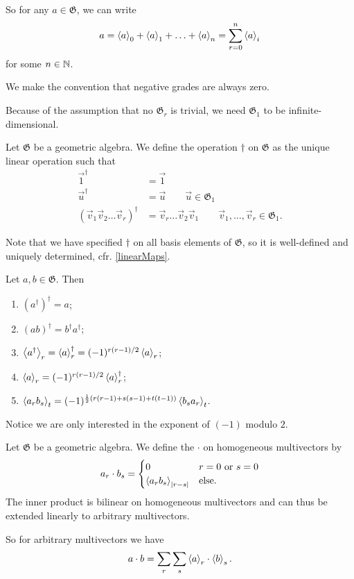 So for any $a\in \mathfrak{G}$, we can write
\[ a = \left\langle a \right\rangle_0 + \left\langle a \right\rangle_1 + \ldots + \left\langle a \right\rangle_n  = \sum_{r=0}^n \left\langle a \right\rangle_i  \] for some $n\in\mathbb{N}$.

We make the convention that negative grades are always zero.

Because of the assumption that no $\mathfrak{G}_r$ is trivial, we need $\mathfrak{G}_1$ to be infinite-dimensional.


\begin{definition}
Let $\mathfrak{G}$ be a geometric algebra. We define the  operation $\dagger$ on $\mathfrak{G}$ as the unique linear operation such that
\begin{align*}
\vec{1}^\dagger &= \vec{1} \\
\vec{u}^\dagger &= \vec{u} \qquad \vec{u}\in\mathfrak{G}_1 \\
(\vec{v}_1 \vec{v}_2 \ldots \vec{v}_r)^\dagger &= \vec{v}_r \ldots \vec{v}_2 \vec{v}_1 \qquad \vec{v}_1, \ldots, \vec{v}_r \in \mathfrak{G}_1.
\end{align*}
\end{definition}
Note that we have specified $\dagger$ on all basis elements of $\mathfrak{G}$, so it is well-defined and uniquely determined, cfr. \ref{linearMaps}.

\begin{lemma}
Let $a,b \in \mathfrak{G}$. Then
\begin{enumerate}
\item $(a^\dagger)^\dagger = a$;
\item $(ab)^\dagger = b^\dagger a^\dagger$;
\item $\left\langle a^\dagger \right\rangle_r = \left\langle a \right\rangle_r^\dagger = (-1)^{r(r-1)/2}\left\langle a \right\rangle_r$;
\item $\left\langle a \right\rangle_r = (-1)^{r(r-1)/2}\left\langle a \right\rangle_r^\dagger$;
\item $\left\langle a_rb_s \right\rangle_t = (-1)^{\frac{1}{2}(r(r-1) + s(s-1) + t(t-1))}\left\langle b_sa_r \right\rangle_t$.
\end{enumerate}
\end{lemma}
Notice we are only interested in the exponent of $(-1)$ modulo $2$.

\begin{definition}
Let $\mathfrak{G}$ be a geometric algebra. We define the  $\cdot$ on homogeneous multivectors by
\[ a_r\cdot b_s = \begin{cases}
0 & \text{$r=0$ or $s=0$} \\
\left\langle a_rb_s \right\rangle_{|r-s|} & \text{else}.
\end{cases}  \]
The inner product is bilinear on homogeneous multivectors and can thus be extended linearly to arbitrary multivectors.
\end{definition}
So for arbitrary multivectors we have
\[ a\cdot b = \sum_r\sum_s \left\langle a \right\rangle_r\cdot \left\langle b \right\rangle_s. \]

